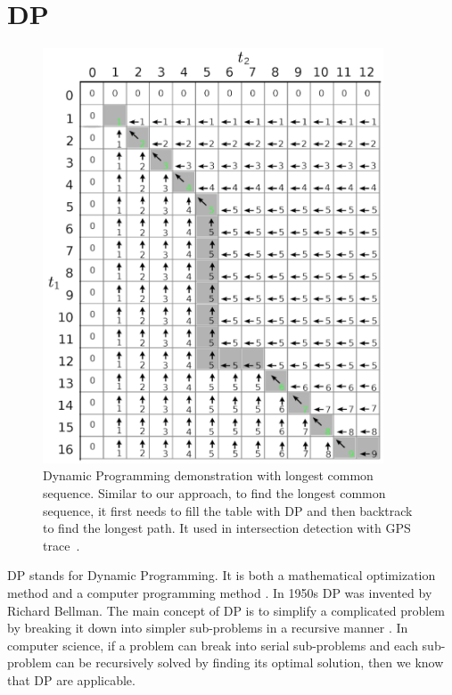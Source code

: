 \section{\ac{DP}}
\begin{figure}
    \centering
    \includegraphics[width=0.9\textwidth]{Figures/longest_common_sequence.png}
    \caption[Demonstration on Longest Common Sequence]{Dynamic Programming demonstration with longest common sequence. Similar to our approach, to find the longest common sequence, it first needs to fill the table with \ac{DP} and then backtrack to find the longest path. It used in intersection detection with GPS trace~\cite{Xie2017DetectingRI}.
    }
    \label{fig:lcs_dp}
\end{figure}

\ac{DP} stands for Dynamic Programming. It is both a mathematical optimization method and a computer programming method \cite{bertsekas2005dynamic}. 
In 1950s \ac{DP} was invented by Richard Bellman\cite{bellman2013dynamic}. 
The main concept of \ac{DP} is to simplify a complicated problem by breaking it down into simpler sub-problems in a recursive manner \cite{howard1966dynamic}. 
In computer science, if a problem can break into serial sub-problems and each sub-problem can be recursively solved by finding its optimal solution, then we know that \ac{DP} are applicable. 


